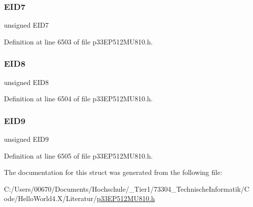 \subsubsection{\texorpdfstring{E\+I\+D7}{EID7}}
{\footnotesize\ttfamily unsigned E\+I\+D7}



Definition at line 6503 of file p33\+E\+P512\+M\+U810.\+h.

\mbox{\label{structtag_c2_r_x_f5_e_i_d_b_i_t_s_acca25e0b7d86eb499d01f85222baea87}} 
\subsubsection{\texorpdfstring{E\+I\+D8}{EID8}}
{\footnotesize\ttfamily unsigned E\+I\+D8}



Definition at line 6504 of file p33\+E\+P512\+M\+U810.\+h.

\mbox{\label{structtag_c2_r_x_f5_e_i_d_b_i_t_s_ac6748f73d4ada8538b06548be4f396c2}} 
\subsubsection{\texorpdfstring{E\+I\+D9}{EID9}}
{\footnotesize\ttfamily unsigned E\+I\+D9}



Definition at line 6505 of file p33\+E\+P512\+M\+U810.\+h.



The documentation for this struct was generated from the following file\+:\begin{DoxyCompactItemize}
\item 
C\+:/\+Users/00670/\+Documents/\+Hochschule/\+\_\+\+Tier1/73304\+\_\+\+Technische\+Informatik/\+Code/\+Hello\+World4.\+X/\+Literatur/\hyperlink{p33_e_p512_m_u810_8h}{p33\+E\+P512\+M\+U810.\+h}\end{DoxyCompactItemize}
